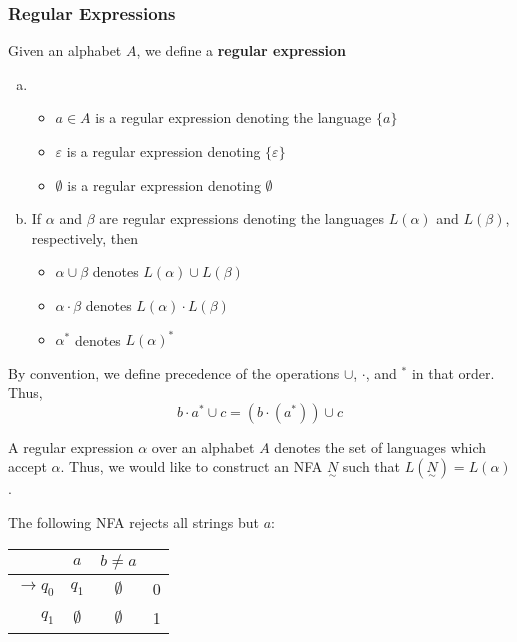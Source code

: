 \subsubsection{Regular Expressions}\label{subsubsec:regular-expressions}
\begin{definition}
Given an alphabet \(A\), we define a \textbf{regular expression}
\begin{enumerate}[(a)]
    \item \begin{itemize}
        \item \(a\in A\) is a regular expression denoting the language \( \{a\} \)
        \item \(\varepsilon \) is a regular expression denoting \( \{\varepsilon \} \)
        \item \(\emptyset \) is a regular expression denoting \(\emptyset \)
    \end{itemize}
    
    \item If \(\alpha \) and \(\beta \) are regular expressions denoting the languages \(L(\alpha)\) and \(L(\beta)\), respectively, then 
    \begin{itemize}
        \item \(\alpha\cup\beta \) denotes \(L(\alpha)\cup L(\beta)\)
        \item \(\alpha\cdot\beta \) denotes \(L(\alpha)\cdot L(\beta)\)
        \item \(\alpha^*\) denotes \(L{(\alpha)}^*\)
    \end{itemize}
\end{enumerate}
\end{definition}

By convention, we define precedence of the operations \(\cup \), \(\cdot \), and \(^*\) in that order. Thus, \[b\cdot a^*\cup c=(b\cdot(a^*))\cup c\]

A regular expression \(\alpha \) over an alphabet \(A\) denotes the set of languages which accept \(\alpha \). Thus, we would like to construct an NFA \(\underset{\sim}{N}\) such that \(L(\underset{\sim}{N})=L(\alpha)\).

The following NFA rejects all strings but \(a\):

\begin{center}\begin{tabular}{r c c r}
      & \(a\) & \(b\neq a\) & \\\bottomrule
      \(\to q_0\) & \(q_1\) & \(\emptyset \) & 0\\
            \(q_1\) & \(\emptyset \) & \(\emptyset \) & 1\\
 \end{tabular}\end{center}

